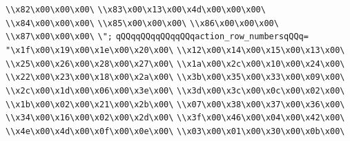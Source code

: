 \verb|\\x82\x00\x00\x00\|\newline
\verb|\\x83\x00\x13\x00\x4d\x00\x00\x00\|\newline
\verb|\\x84\x00\x00\x00\|\newline
\verb|\\x85\x00\x00\x00\|\newline
\verb|\\x86\x00\x00\x00\|\newline
\verb|\\x87\x00\x00\x00\|\newline
\verb|\";|\newline
\verb|qQQqqQQqqQQqqQQqaction_row_numbersqQQq=|\newline
\verb|"\x1f\x00\x19\x00\x1e\x00\x20\x00\|\newline
\verb|\\x12\x00\x14\x00\x15\x00\x13\x00\|\newline
\verb|\\x25\x00\x26\x00\x28\x00\x27\x00\|\newline
\verb|\\x1a\x00\x2c\x00\x10\x00\x24\x00\|\newline
\verb|\\x22\x00\x23\x00\x18\x00\x2a\x00\|\newline
\verb|\\x3b\x00\x35\x00\x33\x00\x09\x00\|\newline
\verb|\\x2c\x00\x1d\x00\x06\x00\x3e\x00\|\newline
\verb|\\x3d\x00\x3c\x00\x0c\x00\x02\x00\|\newline
\verb|\\x1b\x00\x02\x00\x21\x00\x2b\x00\|\newline
\verb|\\x07\x00\x38\x00\x37\x00\x36\x00\|\newline
\verb|\\x34\x00\x16\x00\x02\x00\x2d\x00\|\newline
\verb|\\x3f\x00\x46\x00\x04\x00\x42\x00\|\newline
\verb|\\x4e\x00\x4d\x00\x0f\x00\x0e\x00\|\newline
\verb|\\x03\x00\x01\x00\x30\x00\x0b\x00\|\newline
